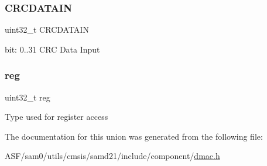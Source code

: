 \subsubsection{\texorpdfstring{CRCDATAIN}{CRCDATAIN}}
{\footnotesize\ttfamily uint32\+\_\+t C\+R\+C\+D\+A\+T\+A\+IN}

bit\+: 0..31 C\+RC Data Input \mbox{\label{union_d_m_a_c___c_r_c_d_a_t_a_i_n___type_a6b91636401516a477989a336376d7b40}} 
\subsubsection{\texorpdfstring{reg}{reg}}
{\footnotesize\ttfamily uint32\+\_\+t reg}

Type used for register access 

The documentation for this union was generated from the following file\+:\begin{DoxyCompactItemize}
\item 
A\+S\+F/sam0/utils/cmsis/samd21/include/component/\mbox{\hyperlink{component_2dmac_8h}{dmac.\+h}}\end{DoxyCompactItemize}
